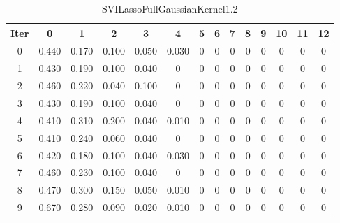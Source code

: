 \begin{table}
	\begin{center}
		\begin{tabular}{|c|c|c|c|c|c|c|c|c|c|c|c|c|c|}
			\hline
			Iter & 0 & 1 & 2 & 3 & 4 & 5 & 6 & 7 & 8 & 9 & 10 & 11 & 12 \\
			\hline
			0 & 0.440 & 0.170 & 0.100 & 0.050 & 0.030 & 0 & 0 & 0 & 0 & 0 & 0 & 0 & 0 \\
			\hline
			1 & 0.430 & 0.190 & 0.100 & 0.040 & 0 & 0 & 0 & 0 & 0 & 0 & 0 & 0 & 0 \\
			\hline
			2 & 0.460 & 0.220 & 0.040 & 0.100 & 0 & 0 & 0 & 0 & 0 & 0 & 0 & 0 & 0 \\
			\hline
			3 & 0.430 & 0.190 & 0.100 & 0.040 & 0 & 0 & 0 & 0 & 0 & 0 & 0 & 0 & 0 \\
			\hline
			4 & 0.410 & 0.310 & 0.200 & 0.040 & 0.010 & 0 & 0 & 0 & 0 & 0 & 0 & 0 & 0 \\
			\hline
			5 & 0.410 & 0.240 & 0.060 & 0.040 & 0 & 0 & 0 & 0 & 0 & 0 & 0 & 0 & 0 \\
			\hline
			6 & 0.420 & 0.180 & 0.100 & 0.040 & 0.030 & 0 & 0 & 0 & 0 & 0 & 0 & 0 & 0 \\
			\hline
			7 & 0.460 & 0.230 & 0.100 & 0.040 & 0 & 0 & 0 & 0 & 0 & 0 & 0 & 0 & 0 \\
			\hline
			8 & 0.470 & 0.300 & 0.150 & 0.050 & 0.010 & 0 & 0 & 0 & 0 & 0 & 0 & 0 & 0 \\
			\hline
			9 & 0.670 & 0.280 & 0.090 & 0.020 & 0.010 & 0 & 0 & 0 & 0 & 0 & 0 & 0 & 0 \\
			\hline
		\end{tabular}
	\end{center}
	\caption{SVILassoFullGaussianKernel1.2}
\end{table}